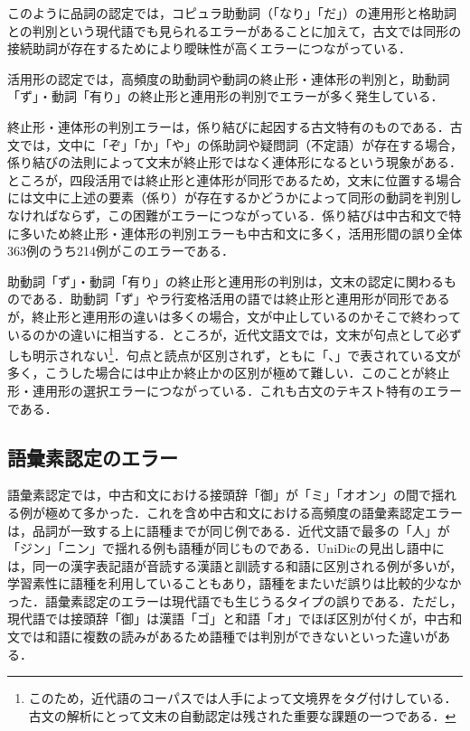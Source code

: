 \documentclass[japanese]{jnlp_1.4}
\begin{document}
このように品詞の認定では，コピュラ助動詞（「なり」「だ」）の連用形と格助詞との判別という現代語でも見られるエラーがあることに加えて，古文では同形の接続助詞が存在するためにより曖昧性が高くエラーにつながっている．

活用形の認定では，高頻度の助動詞や動詞の終止形・連体形の判別と，助動詞「ず」・動詞「有り」の終止形と連用形の判別でエラーが多く発生している．

終止形・連体形の判別エラーは，係り結びに起因する古文特有のものである．古文では，文中に「ぞ」「か」「や」の係助詞や疑問詞（不定語）が存在する場合，係り結びの法則によって文末が終止形ではなく連体形になるという現象がある．ところが，四段活用では終止形と連体形が同形であるため，文末に位置する場合には文中に上述の要素（係り）が存在するかどうかによって同形の動詞を判別しなければならず，この困難がエラーにつながっている．係り結びは中古和文で特に多いため終止形・連体形の判別エラーも中古和文に多く，活用形間の誤り全体363例のうち214例がこのエラーである． 

助動詞「ず」・動詞「有り」の終止形と連用形の判別は，文末の認定に関わるものである．助動詞「ず」やラ行変格活用の語では終止形と連用形が同形であるが，終止形と連用形の違いは多くの場合，文が中止しているのかそこで終わっているのかの違いに相当する．ところが，近代文語文では，文末が句点として必ずしも明示されない\footnote{このため，近代語のコーパスでは人手によって文境界をタグ付けしている．古文の解析にとって文末の自動認定は残された重要な課題の一つである．}．句点と読点が区別されず，ともに「、」で表されている文が多く，こうした場合には中止か終止かの区別が極めて難しい．このことが終止形・連用形の選択エラーにつながっている．これも古文のテキスト特有のエラーである．


\subsection{語彙素認定のエラー}

語彙素認定では，中古和文における接頭辞「御」が「ミ」「オオン」の間で揺れる例が極めて多かった．これを含め中古和文における高頻度の語彙素認定エラーは，品詞が一致する上に語種までが同じ例である．近代文語で最多の「人」が「ジン」「ニン」で揺れる例も語種が同じものである．UniDicの見出し語中には，同一の漢字表記語が音読する漢語と訓読する和語に区別される例が多いが，学習素性に語種を利用していることもあり，語種をまたいだ誤りは比較的少なかった．語彙素認定のエラーは現代語でも生じうるタイプの誤りである．ただし，現代語では接頭辞「御」は漢語「ゴ」と和語「オ」でほぼ区別が付くが，中古和文では和語に複数の読みがあるため語種では判別ができないといった違いがある． 
\end{document}
